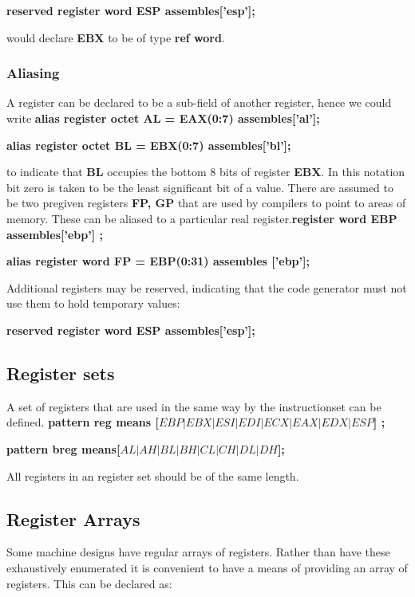 {{\textbf{reserved register word ESP assembles{[}'esp'{]};}

would declare \textbf{EBX} to be of type \textbf{ref word}.


\subsubsection{Aliasing}

A register can be declared to be a sub-field of another register,
hence we could write  \textbf{alias register octet AL = EAX(0:7) assembles{[}'al'{]};}

\textbf{alias register octet BL = EBX(0:7) assembles{[}'bl'{]};}

to indicate that \textbf{BL} occupies the bottom 8 bits of register
\textbf{EBX}. In this notation bit zero is taken to be the least significant
bit of a value. There are assumed to be two pregiven registers \textbf{FP,
GP} that are used by compilers to point to areas of memory. These
can be aliased to a particular real register.\textbf{register word
EBP assembles{[}'ebp'{]} ;}

\textbf{alias register word FP = EBP(0:31) assembles {[}'ebp'{]};}

Additional registers may be reserved, indicating that the code generator
must not use them to hold temporary values:

\textbf{reserved register word ESP assembles{[}'esp'{]}; }


\subsection{Register sets}

A set of registers that are used in the same way by the instructionset
can be defined. \textbf{pattern reg means {[}$EBP|EBX|ESI|EDI|ECX|EAX|EDX|ESP${]}
;}

\textbf{pattern breg means{[}$AL|AH|BL|BH|CL|CH|DL|DH${]}; }

All registers in an register set should be of the same length.


\subsection{Register Arrays}

Some machine designs have regular arrays of registers. Rather than
have these exhaustively enumerated it is convenient to have a means
of providing an array of registers. This can be declared as:

}}
